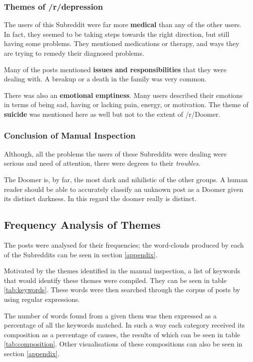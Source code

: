 \documentclass[../report.tex]{subfiles}
\begin{document}
\subsubsection{Themes of /r/depression}
The users of this Subreddit were far more \textbf{medical} than any of the other users. 
In fact, they seemed to be taking steps towards the right direction, but still having some problems. 
They mentioned medications or therapy, and ways they are trying to remedy their diagnosed problems. 

Many of the posts mentioned \textbf{issues and responsibilities} that they were dealing with.
A breakup or a death in the family was very common. 

There was also an \textbf{emotional emptiness}.
Many users described their emotions in terms of being sad, having or lacking pain, energy, or motivation. 
The theme of \textbf{suicide} was mentioned here as well but not to the extent of /r/Doomer.

\subsubsection{Conclusion of Manual Inspection}
Although, all the problems the users of these Subreddits were dealing were serious and need of attention, there were degrees to their \textit{troubles}.

The Doomer is, by far, the most dark and nihilistic of the other groups. 
A human reader should be able to accurately classify an unknown post as a Doomer given its distinct darkness.
In this regard the doomer really is distinct. 

\subsection{Frequency Analysis of Themes}
The posts were analysed for their frequencies; the word-clouds produced by each of the Subreddits can be seen in section \ref{appendix}.

Motivated by the themes identified in the manual inspection, a list of keywords that would identify these themes were compiled. 
They can be seen in table \ref{tab:keywords}.
These words were then searched through the corpus of posts by using regular expressions.

The number of words found from a given them was then expressed as a percentage of all the keywords matched.
In such a way each category received its composition as a percentage of causes, the results of which can be seen in table \ref{tab:composition}.
Other visualisations of these compositions can also be seen in section \ref{appendix}.
\end{document}
